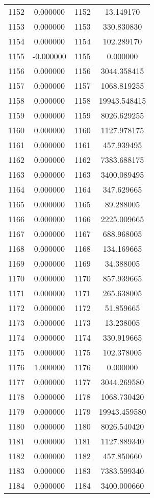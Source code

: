 \documentclass[12pt]{article}
\begin{document}
\begin{longtable}{@{}cccc@{}}
1152 & 0.000000 & 1152 & 13.149170 \\
1153 & 0.000000 & 1153 & 330.830830 \\
1154 & 0.000000 & 1154 & 102.289170 \\
1155 & -0.000000 & 1155 & 0.000000 \\
1156 & 0.000000 & 1156 & 3044.358415 \\
1157 & 0.000000 & 1157 & 1068.819255 \\
1158 & 0.000000 & 1158 & 19943.548415 \\
1159 & 0.000000 & 1159 & 8026.629255 \\
1160 & 0.000000 & 1160 & 1127.978175 \\
1161 & 0.000000 & 1161 & 457.939495 \\
1162 & 0.000000 & 1162 & 7383.688175 \\
1163 & 0.000000 & 1163 & 3400.089495 \\
1164 & 0.000000 & 1164 & 347.629665 \\
1165 & 0.000000 & 1165 & 89.288005 \\
1166 & 0.000000 & 1166 & 2225.009665 \\
1167 & 0.000000 & 1167 & 688.968005 \\
1168 & 0.000000 & 1168 & 134.169665 \\
1169 & 0.000000 & 1169 & 34.388005 \\
1170 & 0.000000 & 1170 & 857.939665 \\
1171 & 0.000000 & 1171 & 265.638005 \\
1172 & 0.000000 & 1172 & 51.859665 \\
1173 & 0.000000 & 1173 & 13.238005 \\
1174 & 0.000000 & 1174 & 330.919665 \\
1175 & 0.000000 & 1175 & 102.378005 \\
1176 & 1.000000 & 1176 & 0.000000 \\
1177 & 0.000000 & 1177 & 3044.269580 \\
1178 & 0.000000 & 1178 & 1068.730420 \\
1179 & 0.000000 & 1179 & 19943.459580 \\
1180 & 0.000000 & 1180 & 8026.540420 \\
1181 & 0.000000 & 1181 & 1127.889340 \\
1182 & 0.000000 & 1182 & 457.850660 \\
1183 & 0.000000 & 1183 & 7383.599340 \\
1184 & 0.000000 & 1184 & 3400.000660 \\

\end{longtable}
\end{document}
